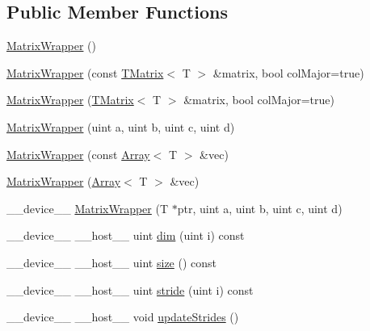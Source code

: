 \subsection*{Public Member Functions}
\begin{DoxyCompactItemize}
\item 
\hyperlink{classamunmt_1_1GPU_1_1mblas_1_1MatrixWrapper_a963aad752bc0dfb4264cdfe30a065fc7}{Matrix\+Wrapper} ()
\item 
\hyperlink{classamunmt_1_1GPU_1_1mblas_1_1MatrixWrapper_a4187cbbb8d69e2b7ef67a1d4ee9b614b}{Matrix\+Wrapper} (const \hyperlink{classamunmt_1_1GPU_1_1mblas_1_1TMatrix}{T\+Matrix}$<$ T $>$ \&matrix, bool col\+Major=true)
\item 
\hyperlink{classamunmt_1_1GPU_1_1mblas_1_1MatrixWrapper_a306ec23b431f032ab32612b3b04e2252}{Matrix\+Wrapper} (\hyperlink{classamunmt_1_1GPU_1_1mblas_1_1TMatrix}{T\+Matrix}$<$ T $>$ \&matrix, bool col\+Major=true)
\item 
\hyperlink{classamunmt_1_1GPU_1_1mblas_1_1MatrixWrapper_a8424c79a1e32a6ecda10e949a0684933}{Matrix\+Wrapper} (uint a, uint b, uint c, uint d)
\item 
\hyperlink{classamunmt_1_1GPU_1_1mblas_1_1MatrixWrapper_aadf70ef14c89755a661690225179e482}{Matrix\+Wrapper} (const \hyperlink{classamunmt_1_1GPU_1_1mblas_1_1Array}{Array}$<$ T $>$ \&vec)
\item 
\hyperlink{classamunmt_1_1GPU_1_1mblas_1_1MatrixWrapper_a6d96130479c24d1c4cac1ba852041f18}{Matrix\+Wrapper} (\hyperlink{classamunmt_1_1GPU_1_1mblas_1_1Array}{Array}$<$ T $>$ \&vec)
\item 
\+\_\+\+\_\+device\+\_\+\+\_\+ \hyperlink{classamunmt_1_1GPU_1_1mblas_1_1MatrixWrapper_a799324b54b661c6afce33713f95ec934}{Matrix\+Wrapper} (T $\ast$ptr, uint a, uint b, uint c, uint d)
\item 
\+\_\+\+\_\+device\+\_\+\+\_\+ \+\_\+\+\_\+host\+\_\+\+\_\+ uint \hyperlink{classamunmt_1_1GPU_1_1mblas_1_1MatrixWrapper_a8846d6edb1c807c90f9aa23f4193a665}{dim} (uint i) const 
\item 
\+\_\+\+\_\+device\+\_\+\+\_\+ \+\_\+\+\_\+host\+\_\+\+\_\+ uint \hyperlink{classamunmt_1_1GPU_1_1mblas_1_1MatrixWrapper_aed1483dbf0148749d04eea433582e802}{size} () const 
\item 
\+\_\+\+\_\+device\+\_\+\+\_\+ \+\_\+\+\_\+host\+\_\+\+\_\+ uint \hyperlink{classamunmt_1_1GPU_1_1mblas_1_1MatrixWrapper_a8e0bd961034d3596ec4a93dfaf58c5a7}{stride} (uint i) const 
\item 
\+\_\+\+\_\+device\+\_\+\+\_\+ \+\_\+\+\_\+host\+\_\+\+\_\+ void \hyperlink{classamunmt_1_1GPU_1_1mblas_1_1MatrixWrapper_a218d0f178d9f187978212e49641c0940}{update\+Strides} ()

\end{DoxyCompactItemize}
